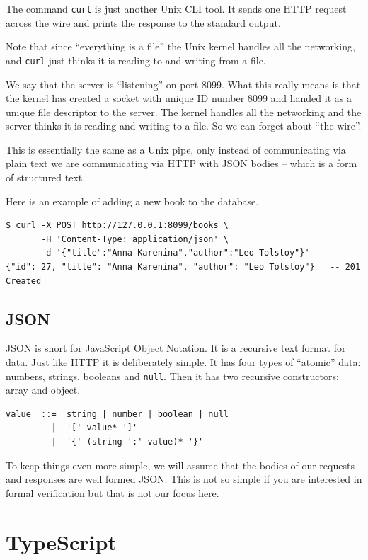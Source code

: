 \documentclass[11pt,a4paper]{article}
\begin{document}
The command \texttt{curl} is just another Unix CLI tool. It sends one HTTP request across the wire
and prints the response to the standard output.

Note that since ``everything is a file'' the Unix kernel handles all the networking, and
\texttt{curl} just thinks it is reading to and writing from a file.

We say that the server is ``listening'' on port 8099. What this really means is that the kernel
has created a socket with unique ID number 8099 and handed it as a unique file descriptor to the
server. The kernel handles all the networking and the server thinks it is reading and writing to
a file. So we can forget about ``the wire''.

This is essentially the same as a Unix pipe, only instead of communicating via plain text we are
communicating via HTTP with JSON bodies -- which is a form of structured text.

Here is an example of adding a new book to the database.

\begin{lstlisting}[language=SH]
$ curl -X POST http://127.0.0.1:8099/books \
       -H 'Content-Type: application/json' \
       -d '{"title":"Anna Karenina","author":"Leo Tolstoy"}'
{"id": 27, "title": "Anna Karenina", "author": "Leo Tolstoy"}   -- 201 Created
\end{lstlisting}

\subsection{JSON}

JSON is short for JavaScript Object Notation. It is a recursive text format for data. Just like
HTTP it is deliberately simple. It has four types of ``atomic'' data: numbers, strings, booleans
and \texttt{null}. Then it has two recursive constructors: array and object.

\begin{lstlisting}
value  ::=  string | number | boolean | null
         |  '[' value* ']'
         |  '{' (string ':' value)* '}'
\end{lstlisting}

To keep things even more simple, we will assume that the bodies of our requests and responses are
well formed JSON. This is not so simple if you are interested in formal verification but that is
not our focus here.

\newpage

\section{TypeScript}
\label{sec:respval}
\end{document}
